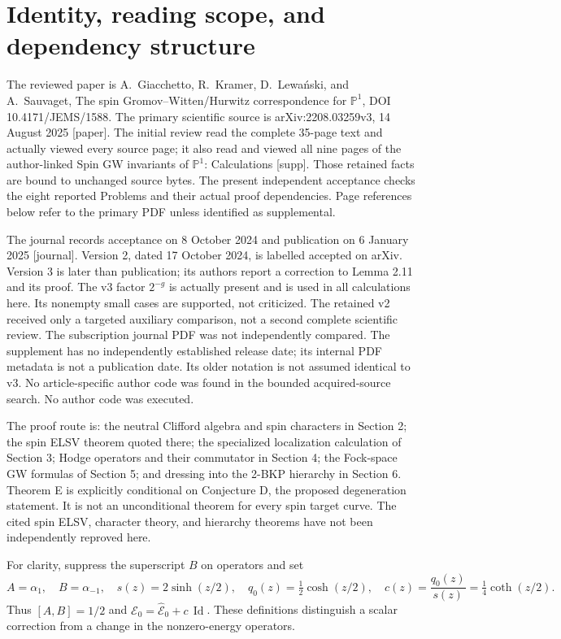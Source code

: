 \documentclass[10pt]{article}
\begin{document}
\section*{Identity, reading scope, and dependency structure}
The reviewed paper is A. Giacchetto, R. Kramer, D. Lewański, and A. Sauvaget, The spin Gromov–Witten/Hurwitz correspondence for \(\mathbb P^1\), DOI 10.4171/JEMS/1588. The primary scientific source is arXiv:2208.03259v3, 14 August 2025 [paper]. The initial review read the complete 35-page text and actually viewed every source page; it also read and viewed all nine pages of the author-linked Spin GW invariants of \(\mathbb P^1\): Calculations [supp]. Those retained facts are bound to unchanged source bytes. The present independent acceptance checks the eight reported Problems and their actual proof dependencies. Page references below refer to the primary PDF unless identified as supplemental.\par
The journal records acceptance on 8 October 2024 and publication on 6 January 2025 [journal]. Version 2, dated 17 October 2024, is labelled accepted on arXiv. Version 3 is later than publication; its authors report a correction to Lemma 2.11 and its proof. The v3 factor \(2^{-g}\) is actually present and is used in all calculations here. Its nonempty small cases are supported, not criticized. The retained v2 received only a targeted auxiliary comparison, not a second complete scientific review. The subscription journal PDF was not independently compared. The supplement has no independently established release date; its internal PDF metadata is not a publication date. Its older notation is not assumed identical to v3. No article-specific author code was found in the bounded acquired-source search. No author code was executed.\par
The proof route is: the neutral Clifford algebra and spin characters in Section 2; the spin ELSV theorem quoted there; the specialized localization calculation of Section 3; Hodge operators and their commutator in Section 4; the Fock-space GW formulas of Section 5; and dressing into the 2-BKP hierarchy in Section 6. Theorem E is explicitly conditional on Conjecture D, the proposed degeneration statement. It is not an unconditional theorem for every spin target curve. The cited spin ELSV, character theory, and hierarchy theorems have not been independently reproved here.\par
For clarity, suppress the superscript \(B\) on operators and set \[A=\alpha_1,\quad B=\alpha_{-1},\quad
 s(z)=2\sinh(z/2),\quad q_0(z)=\tfrac12\cosh(z/2),\quad
 c(z)=\frac{q_0(z)}{s(z)}=\tfrac14\coth(z/2).\] Thus \([A,B]=1/2\) and \(\mathcal E_0=\widehat{\mathcal E}_0+c\,\operatorname{Id}\). These definitions distinguish a scalar correction from a change in the nonzero-energy operators.\par
\end{document}
